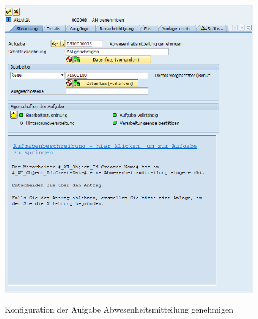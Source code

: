 \begin{figure}[H]
	\begin{center}
	\includegraphics[width=1.0\textwidth]{grafiken/wf-builder_bsp2_act_am-genehmigen.png}
	\caption{Konfiguration der Aufgabe Abwesenheitsmitteilung genehmigen}
	\vspace{-10pt}
	\label{abb:workflow-bsp2-act_am-genehmigen}
	\end{center}
\end{figure}

